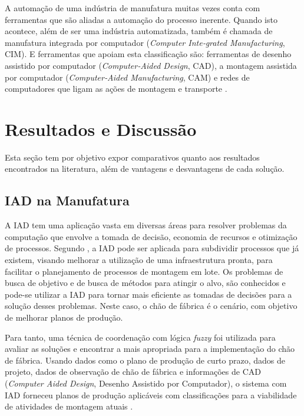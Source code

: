 \documentclass[
	article,			    %
	12pt,				    %
	oneside,			    %
	a4paper,			    %
	chapter=TITLE,		    %
	section=TITLE,		    %
	subsection=TITLE,	    %
	english,			    %
	brazil,				    %
	sumario=tradicional
]{abntex2}
\begin{document}
A automação de uma indústria de manufatura muitas vezes conta com ferramentas que são aliadas a automação do processo inerente. Quando isto acontece, além de ser uma indústria automatizada, também é chamada de manufatura integrada por computador (\emph{Computer Inte‐grated Manufacturing}, CIM). E ferramentas que apoiam esta classificação são: ferramentas de desenho assistido por computador (\emph{Computer‐Aided Design}, CAD), a montagem assistida por computador (\emph{Computer‐Aided Manufacturing}, CAM) e redes de computadores que ligam as ações de montagem e transporte \cite{groover2011automacao}.

\section{Resultados e Discussão}
Esta seção tem por objetivo expor comparativos quanto aos resultados encontrados na literatura, além de vantagens e desvantagens de cada solução.

\subsection{IAD na Manufatura}
A IAD tem uma aplicação vasta em diversas áreas para resolver problemas da computação que envolve a tomada de decisão, economia de recursos e otimização de processos. Segundo , a IAD pode ser aplicada para subdividir processos que já existem, visando melhorar a utilização de uma infraestrutura pronta, para facilitar o planejamento de processos de montagem em lote. Os problemas de busca de objetivo e de busca de métodos para atingir o alvo, são conhecidos e pode-se utilizar a IAD para tornar mais eficiente as tomadas de decisões para a solução desses problemas. Neste caso, o chão de fábrica é o cenário, com objetivo de melhorar planos de produção.

Para tanto, uma técnica de coordenação com lógica \emph{fuzzy} foi utilizada para avaliar as soluções e encontrar a mais apropriada para a implementação do chão de fábrica. Usando dados como o plano de produção de curto prazo, dados de projeto, dados de observação de chão de fábrica e informações de CAD (\emph{Computer Aided Design}, Desenho Assistido por Computador), o sistema com IAD forneceu planos de produção aplicáveis com classificações para a viabilidade de atividades de montagem atuais \cite{SHIH1995199}.
\end{document}
